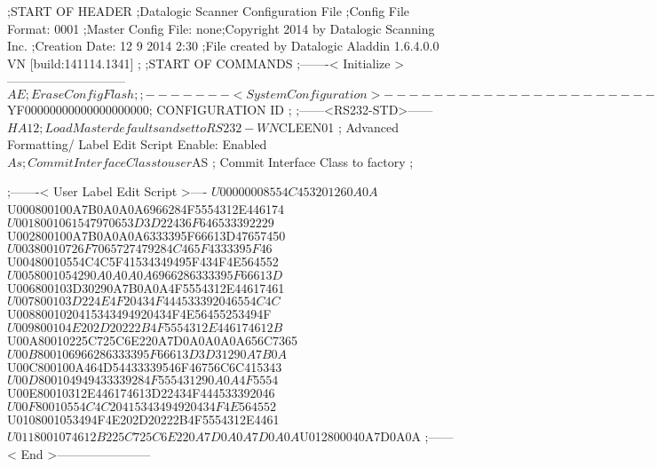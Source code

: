 ;START OF HEADER
;Datalogic Scanner Configuration File
;Config File Format: 0001
;Master Config File: none;Copyright 2014 by Datalogic Scanning Inc.
;Creation Date: 12 9 2014 2:30
;File created by Datalogic Aladdin 1.6.4.0.0 VN [build:141114.1341]
;
;START OF COMMANDS
;-------< Initialize >-----------------------------
$AE                 ; Erase Config Flash
;
;-------< System Configuration >-------------------------------
$YF00000000000000000000; CONFIGURATION ID
;
;------<RS232-STD>------
$HA12               ; Load Master defaults and set to RS232-WN
$CLEEN01            ; Advanced Formatting/ Label Edit Script Enable: Enabled
$As                 ; Commit Interface Class to user
$AS                 ; Commit Interface Class to factory
;

;-------< User Label Edit Script >----
$U00000008554C453201260A0A
$U000800100A7B0A0A0A6966284F5554312E446174
$U0018001061547970653D3D22436F646533392229
$U002800100A7B0A0A0A6333395F66613D47657450
$U00380010726F7065727479284C465F4333395F46
$U00480010554C4C5F41534349495F434F4E564552
$U0058001054290A0A0A0A6966286333395F66613D
$U006800103D30290A7B0A0A4F5554312E44617461
$U007800103D224E4F20434F444533392046554C4C
$U0088001020415343494920434F4E56455253494F
$U009800104E202D20222B4F5554312E446174612B
$U00A80010225C725C6E220A7D0A0A0A0A656C7365
$U00B800106966286333395F66613D3D31290A7B0A
$U00C800100A464D54433339546F46756C6C415343
$U00D800104949433339284F555431290A0A4F5554
$U00E80010312E446174613D22434F444533392046
$U00F80010554C4C20415343494920434F4E564552
$U0108001053494F4E202D20222B4F5554312E4461
$U0118001074612B225C725C6E220A7D0A0A7D0A0A
$U012800040A7D0A0A
;------< End >-----------------------
